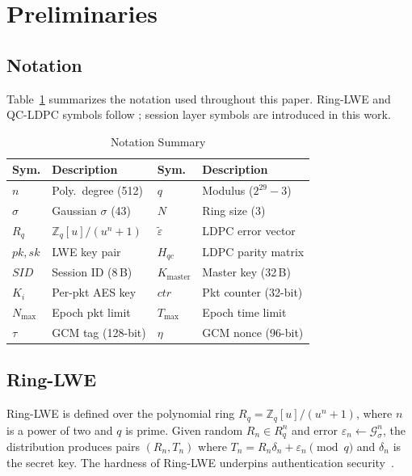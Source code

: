 \documentclass[conference]{IEEEtran}
\newcommand{\Kmaster}{K_{\mathrm{master}}}
\newcommand{\Nmax}{N_{\max}}
\newcommand{\Tmax}{T_{\max}}
\newcommand{\SID}{\mathit{SID}}
\begin{document}
\section{Preliminaries}
\label{sec:prelim}

\subsection{Notation}

Table~\ref{tab:notation} summarizes the notation used throughout this
paper. Ring-LWE and QC-LDPC symbols follow \cite{kumari2022}; session
layer symbols are introduced in this work.

\begin{table}[t]
\centering
\caption{Notation Summary}
\label{tab:notation}
\renewcommand{\arraystretch}{1.1}
\begin{tabular}{p{1.2cm}p{2.8cm}|p{0.8cm}p{2.2cm}}
\toprule
\textbf{Sym.} & \textbf{Description} & \textbf{Sym.} & \textbf{Description} \\
\midrule
$n$ & Poly.\ degree (512) & $q$ & Modulus ($2^{29}{-}3$) \\
$\sigma$ & Gaussian $\sigma$ (43) & $N$ & Ring size (3) \\
$R_q$ & $\mathbb{Z}_q[u]/(u^n{+}1)$ & $\tilde{\varepsilon}$ & LDPC error vector \\
$pk,sk$ & LWE key pair & $H_{qc}$ & LDPC parity matrix \\
$\SID$ & Session ID (8\,B) & $\Kmaster$ & Master key (32\,B) \\
$K_i$ & Per-pkt AES key & $ctr$ & Pkt counter (32-bit) \\
$\Nmax$ & Epoch pkt limit & $\Tmax$ & Epoch time limit \\
$\tau$ & GCM tag (128-bit) & $\eta$ & GCM nonce (96-bit) \\
\bottomrule
\end{tabular}
\end{table}

\subsection{Ring-LWE}

Ring-LWE is defined over the polynomial ring
$R_q = \mathbb{Z}_q[u]/(u^n+1)$, where $n$ is a power of two and $q$
is prime. Given random $R_n \in R_q^n$ and error
$\varepsilon_n \leftarrow \mathcal{G}^n_\sigma$, the distribution
produces pairs $(R_n, T_n)$ where
$T_n = R_n \delta_n + \varepsilon_n \pmod{q}$ and $\delta_n$ is the
secret key. The hardness of Ring-LWE underpins authentication
security~\cite{lyubashevsky2013}.
\end{document}
